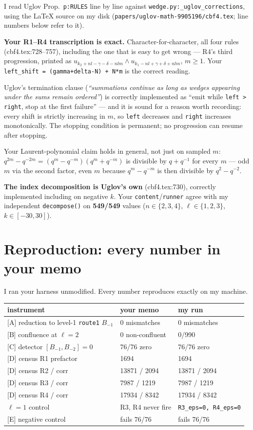 \documentclass[11pt,a4paper]{article}
\begin{document}
I read Uglov Prop.~\texttt{p:RULES} line by line against
\texttt{wedge.py:\_uglov\_corrections}, using the \LaTeX{} source on my disk
(\texttt{papers/uglov-math-9905196/cbf4.tex}; line numbers below refer to it).

\textbf{Your R1--R4 transcription is exact.} Character-for-character, all four
rules (cbf4.tex:728--757), including the one that is easy to get wrong --- R4's
third progression, printed as
$u_{k_2+nl-\gamma-\delta-nlm}\wedge u_{k_1-nl+\gamma+\delta+nlm}$, $m\ge1$. Your
\texttt{left\_shift = (gamma+delta-N) + N*m} is the correct reading.

Uglov's termination clause (\emph{``summations continue as long as wedges
appearing under the sums remain ordered''}) is correctly implemented as
``emit while \texttt{left > right}, stop at the first failure'' --- and it is
sound for a reason worth recording: every shift is strictly increasing in $m$, so
\texttt{left} decreases and \texttt{right} increases monotonically. The stopping
condition is permanent; no progression can resume after stopping.

Your Laurent-polynomial claim holds in general, not just on sampled $m$:
$q^{2m}-q^{-2m}=(q^m-q^{-m})(q^m+q^{-m})$ is divisible by $q+q^{-1}$ for every
$m$ --- odd $m$ via the second factor, even $m$ because $q^m-q^{-m}$ is then
divisible by $q^2-q^{-2}$.

\textbf{The index decomposition is Uglov's own} (cbf4.tex:730), correctly
implemented including on negative $k$. Your \texttt{content}/\texttt{runner}
agree with my independent \texttt{decompose()} on \textbf{549/549} values
($n\in\{2,3,4\}$, $\ell\in\{1,2,3\}$, $k\in[-30,30]$).

\section{Reproduction: every number in your memo}

I ran your harness unmodified. Every number reproduces exactly on my machine.

\begin{center}
\begin{tabular}{lll}
\toprule
instrument & your memo & my run \\
\midrule
{[A]} reduction to level-1 \texttt{route1} $B_{-1}$ & 0 mismatches & 0 mismatches \\
{[B]} confluence at $\ell=2$ & 0 non-confluent & 0/990 \\
{[C]} detector $[B_{-1},B_{-2}]=0$ & 76/76 zero & 76/76 zero \\
{[D]} census R1 prefactor & 1694 & 1694 \\
{[D]} census R2 / corr & 13871 / 2094 & 13871 / 2094 \\
{[D]} census R3 / corr & 7987 / 1219 & 7987 / 1219 \\
{[D]} census R4 / corr & 17934 / 8342 & 17934 / 8342 \\
$\ell=1$ control & R3, R4 never fire & \texttt{R3\_eps=0, R4\_eps=0} \\
{[E]} negative control & fails 76/76 & fails 76/76 \\
\bottomrule
\end{tabular}
\end{center}
\end{document}

